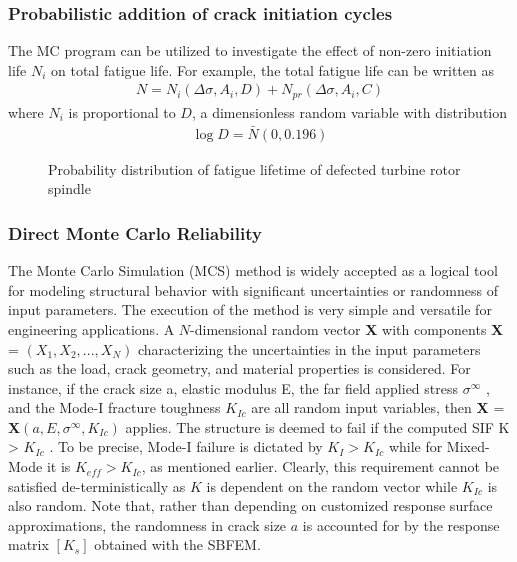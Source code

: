 \documentclass[12pt]{article}
\begin{document}
\subsubsection{Probabilistic addition of crack initiation cycles} 
The MC program can be utilized to investigate the effect of non-zero 
initiation life $N_i$ on total fatigue life. For example, the total fatigue life can be written as
\begin{align*}
    N = N_i(\Delta \sigma, A_i, D) + N_{pr}(\Delta \sigma, A_i, C)
\end{align*}
where $N_i$ is proportional to $D$, a dimensionless random
variable with distribution
\begin{align*}
    \log D = \bar{N}(0, 0.196)
\end{align*}

\begin{figure}[H]
    \centering
    \captionsetup{labelformat=empty} 
    \caption{Probability distribution of fatigue lifetime of defected turbine rotor spindle} 
\end{figure}


\subsubsection{Direct Monte Carlo Reliability}
The Monte Carlo Simulation (MCS) method is widely accepted as a logical tool for modeling structural behavior with significant 
uncertainties or randomness of input parameters. The execution of the method is very simple and versatile for
engineering applications. A $N$-dimensional random vector {\bf X} with components {\bf X} = $(X_1 , X_2 , . . . , X_N )$ characterizing the 
uncertainties in the input parameters such as the load, crack geometry, and material properties is considered. For instance, if
the crack size a, elastic modulus E, the far field applied stress $\sigma^\infty$ , and the Mode-I fracture toughness $K_{Ic}$ are all random input
variables, then \textbf{X} = \textbf{X}$(a, E, \sigma^\infty , K_{Ic} )$ applies. The structure is deemed to fail if the computed SIF K > $K_{Ic}$ . To be precise, Mode-I
failure is dictated by $K_I > K_{Ic}$ while for Mixed-Mode it is ${K_{eff} > K_{Ic} }$, as mentioned earlier. Clearly, this
requirement cannot be satisfied de-terministically as $K$ is dependent on the random vector while $K_{Ic}$ is also random. Note
that, rather than depending on customized response surface approximations, the randomness in crack size $a$ is accounted
for by the response matrix $[K_s ]$ obtained with the SBFEM.
\end{document}
